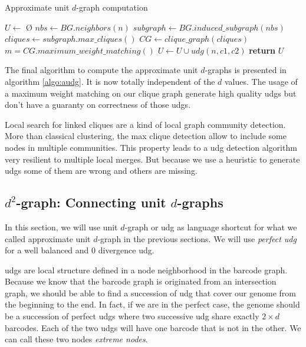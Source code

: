 \documentclass{article}
\begin{document}
\begin{algorithm}
    \caption{Approximate unit $d$-graph computation}
    \label{algo:audg}
    \begin{algorithmic}[1] %
         
            \State $U \gets$ \O
            \State $nbs\gets BG.neighbors(n)$
            \State $subgraph \gets BG.induced\_subgraph(nbs)$
            \State $cliques \gets subgraph.max\_cliques()$ 
            \State $CG \gets clique\_graph(cliques)$ 
            \State $m = CG.maximum\_weight\_matching()$
                \State $U \gets U \cup udg(n, c1, c2)$ 
            \EndFor
            \State \textbf{return} $U$
        \EndProcedure
    \end{algorithmic}
\end{algorithm}

The final algorithm to compute the approximate unit $d$-graphs is presented in algorithm \ref{algo:audg}.
It is now totally independent of the $d$ values.
The usage of a maximum weight matching on our clique graph generate high quality udgs but don't have a guaranty on correctness of those udgs.

Local search for linked cliques are a kind of local graph community detection.
More than classical clustering, the max clique detection allow to include some nodes in multiple communities.
This property leads to a udg detection algorithm very resilient to multiple local merges.
But because we use a heuristic to generate udgs some of them are wrong and others are missing.

\subsection{$d^{2}$-graph: Connecting unit $d$-graphs}

In this section, we will use unit $d$-graph or udg as language shortcut for what we called approximate unit $d$-graph in the previous sections.
We will use \textit{perfect udg} for a well balanced and 0 divergence udg.

udgs are local structure defined in a node neighborhood in the barcode graph.
Because we know that the barcode graph is originated from an intersection graph, we should be able to find a succession of udg that cover our genome from the beginning to the end.
In fact, if we are in the perfect case, the genome should be a succession of perfect udgs where two successive udg share exactly $2 \times d$ barcodes.
Each of the two udgs will have one barcode that is not in the other.
We can call these two nodes \textit{extreme nodes}.
\end{document}

